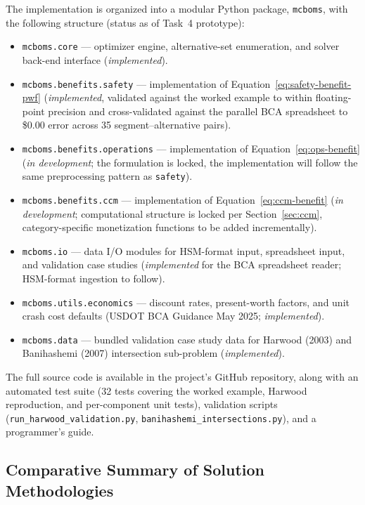 The implementation is organized into a modular Python package,
\texttt{mcboms}, with the following structure (status as of Task~4
prototype):
\begin{itemize}[leftmargin=2em, itemsep=2pt]
  \item \texttt{mcboms.core} --- optimizer engine, alternative-set
    enumeration, and solver back-end interface (\emph{implemented}).
  \item \texttt{mcboms.benefits.safety} --- implementation of
    Equation~\ref{eq:safety-benefit-pwf} (\emph{implemented}, validated
    against the worked example to within floating-point precision and
    cross-validated against the parallel BCA spreadsheet to \$0.00 error
    across 35 segment--alternative pairs).
  \item \texttt{mcboms.benefits.operations} --- implementation of
    Equation~\ref{eq:ops-benefit} (\emph{in development}; the
    formulation is locked, the implementation will follow the same
    preprocessing pattern as \texttt{safety}).
  \item \texttt{mcboms.benefits.ccm} --- implementation of
    Equation~\ref{eq:ccm-benefit} (\emph{in development}; computational
    structure is locked per Section~\ref{sec:ccm}, category-specific
    monetization functions to be added incrementally).
  \item \texttt{mcboms.io} --- data I/O modules for HSM-format input,
    spreadsheet input, and validation case studies (\emph{implemented}
    for the BCA spreadsheet reader; HSM-format ingestion to follow).
  \item \texttt{mcboms.utils.economics} --- discount rates, present-worth
    factors, and unit crash cost defaults (USDOT BCA Guidance May 2025;
    \emph{implemented}).
  \item \texttt{mcboms.data} --- bundled validation case study data for
    Harwood (2003) and Banihashemi (2007) intersection sub-problem
    (\emph{implemented}).
\end{itemize}

The full source code is available in the project's GitHub repository,
along with an automated test suite (32 tests covering the worked example,
Harwood reproduction, and per-component unit tests), validation scripts
(\texttt{run\_harwood\_validation.py},
\texttt{banihashemi\_intersections.py}), and a programmer's guide.

\subsection{Comparative Summary of Solution Methodologies}

